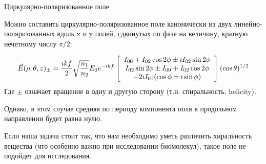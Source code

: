 \documentclass[9pt, compress, xcolor=table]{beamer}
\begin{document}
\begin{frame}{Циркулярно-поляризованное поле}
    
Можно составить циркулярно-поляризованное поле канонически из двух линейно-поляризованных вдоль x и y
полей, сдвинутых по фазе на величину, кратную нечетному числу $\pi/2$:

\begin{equation*}
\begin{gathered}
\vec E(\rho, \theta, z)_{\pm} = \frac{\imath k f}{2} \sqrt {\frac{n_1}{n_2}}E_0 e^{-\imath k f}
\left[\array{c} I_{00} + I_{02}\cos 2 \phi \pm \imath I_{02} \sin 2 \phi\\ I_{02} \sin 2 \phi \pm I_{00} + I_{02}\cos 2 \phi\\ -2 \imath I_{01}(\cos \phi\pm\imath \sin\phi)
\endarray\right] (\cos \theta)^{1/2}
\end{gathered}
\end{equation*}
Где $\pm$ означает вращение в одну и другую сторону (т.н. спиральность, helicity).

\textcolor{red!50!black}{Однако}, в этом случае средняя по периоду компонента поля в продольном направлении будет равна нулю.

Если наша задача стоит так, что нам необходимо уметь различить хиральность вещества (что особенно важно при исследовании биомолекул), такое поле не подойдет для исследования.
    
\end{frame}
\end{document}

